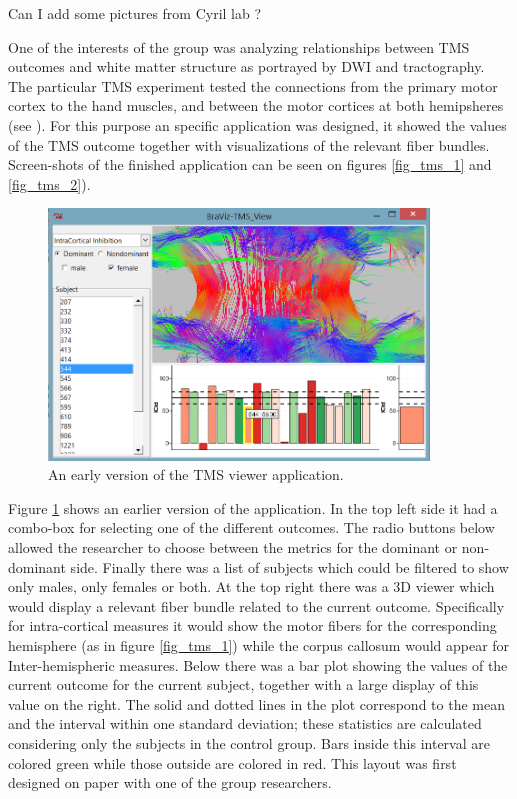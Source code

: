 Can I add some pictures from Cyril lab ?

 


One of the interests of the group was analyzing relationships between TMS outcomes and white matter structure as portrayed by DWI and tractography. The particular TMS experiment tested the connections from the primary motor cortex to the hand muscles, and between the motor cortices at both hemipsheres (see \autocite{schneider_cerebral_2012}). For this purpose an specific application was designed, it showed the values of the TMS outcome together with visualizations of the relevant fiber bundles. Screen-shots of the finished application can be seen on figures \ref{fig_tms_1} and \ref{fig_tms_2}). 

\begin{figure}
	\centering
		\includegraphics[width=0.90\textwidth]{figures/analysis/tms_view_early}
	\caption{An early version of the TMS viewer application.}
	\label{fig_tms_view_early}
\end{figure}

Figure \ref{fig_tms_view_early} shows an earlier version of the application. In the top left side it had a combo-box for selecting one of the different outcomes. The radio buttons below allowed the researcher to choose between the metrics for the dominant or non-dominant side. Finally there was a list of subjects which could be filtered to show only males, only females or both. At the top right there was a 3D viewer which would display a relevant fiber bundle related to the current outcome. Specifically for intra-cortical measures it would show the motor fibers for the corresponding hemisphere (as in figure \ref{fig_tms_1}) while the corpus callosum would appear for Inter-hemispheric measures.
Below there was a bar plot showing the values of the current outcome for the current subject, together with a large display of this value on the right. The solid and dotted lines in the plot correspond to the mean and the interval within one standard deviation; these statistics are calculated considering only the subjects in the control group. Bars inside this interval are colored green while those outside are colored in red.
This layout was first designed on paper with one of the group researchers. 

